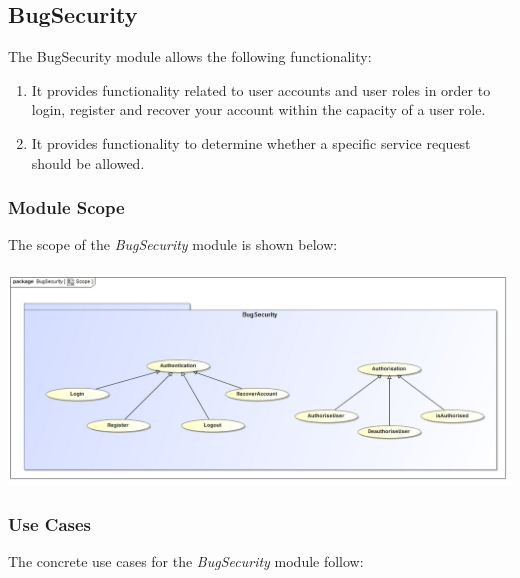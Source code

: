 \documentclass[11pt,a4paper,titlepage]{article}
\begin{document}
		
	\subsection{BugSecurity}
	The BugSecurity module allows the following functionality:
	\begin{enumerate}
		\item It provides functionality related to user accounts and user roles in order to login, register and recover your account within the capacity of a user role.
		\item It provides functionality to determine whether a specific service request should be allowed.
	\end{enumerate}
		\subsubsection{Module Scope}
		The scope of the \textit{BugSecurity} module is shown below:\\
		\hfill\\
		\includegraphics[width=\linewidth]{SecurityScope}
		\subsubsection{Use Cases}
		The concrete use cases for the \textit{BugSecurity} module follow:
		
\end{document}
